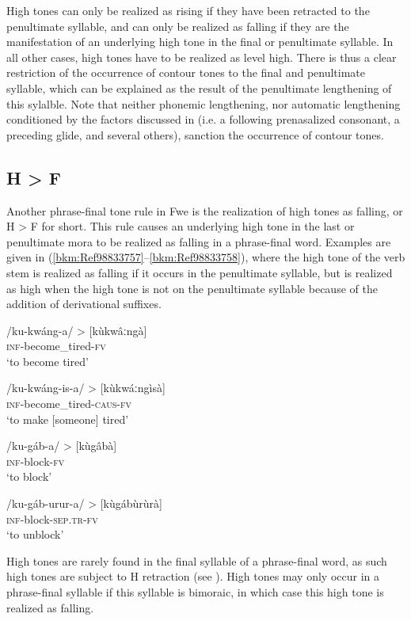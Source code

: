 High tones can only be realized as rising if they have been retracted to the penultimate syllable, and can only be realized as falling if they are the manifestation of an underlying high tone in the final or penultimate syllable. In all other cases, high tones have to be realized as level high. There is thus a clear restriction of the occurrence of contour tones to the final and penultimate syllable, which can be ex\-plained as the result of the penultimate lengthening of this sylalble. Note that neither phonemic length\-ening, nor automatic lengthening conditioned by the factors discussed in  (i.e. a following prenasalized consonant, a preceding glide, and several others), sanction the occurrence of contour tones.

\subsection{H > F}
\label{bkm:Ref432074291}\hypertarget{Toc75352622}{}
Another phrase-final tone rule in Fwe is the realization of high tones as falling, or H > F for short. This rule causes an underlying high tone in the last or penultimate mora to be realized as falling in a phrase-final word. Examples are given in (\ref{bkm:Ref98833757}--\ref{bkm:Ref98833758}), where the high tone of the verb stem is realized as falling if it occurs in the penultimate syllable, but is realized as high when the high tone is not on the penultimate syllable because of the addition of derivational suffixes.

\ea
\label{bkm:Ref98833757}
/ku-kwáng-a/ > [kùkwâːngà]\\
\textsc{inf}-become\_tired-\textsc{fv}\\
\glt ‘to become tired’
\z

\ea
/ku-kwáng-is-a/ > [kùkwáːngìsà]\\
\textsc{inf}-become\_tired-\textsc{caus}-\textsc{fv}\\
\glt ‘to make [someone] tired’
\z

\ea
\label{bkm:Ref98833758}
/ku-gáb-a/ > [kùgâbà]\\
\textsc{inf}-block-\textsc{fv}\\
\glt ‘to block’
\z

\ea
/ku-gáb-urur-a/ > [kùgábùrùrà]\\
\textsc{inf}-block-\textsc{sep}.\textsc{tr}-\textsc{fv}\\
\glt ‘to unblock’
\z

High tones are rarely found in the final syllable of a phrase-final word, as such high tones are sub\-ject to H retraction (see ). High tones may only occur in a phrase-final syllable if this syllable is bimoraic, in which case this high tone is realized as falling.

